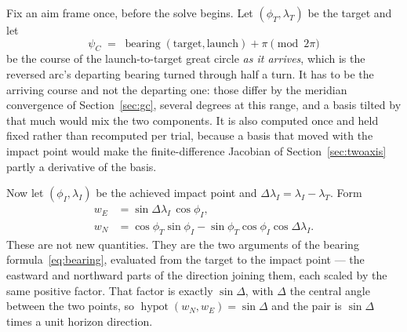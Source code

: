 \documentclass[11pt]{article}
\begin{document}
Fix an aim frame once, before the solve begins. Let $(\phi_T,\lambda_T)$ be the
target and let
\begin{equation}
  \psi_C \;=\; \operatorname{bearing}(\text{target},\text{launch}) + \pi
  \pmod{2\pi}
  \label{eq:psic}
\end{equation}
be the course of the launch-to-target great circle \emph{as it arrives}, which
is the reversed arc's departing bearing turned through half a turn. It has to
be the arriving course and not the departing one: those differ by the meridian
convergence of Section~\ref{sec:gc}, several degrees at this range, and a basis
tilted by that much would mix the two components. It is also computed once and
held fixed rather than recomputed per trial, because a basis that moved with
the impact point would make the finite-difference Jacobian of
Section~\ref{sec:twoaxis} partly a derivative of the basis.

Now let $(\phi_I,\lambda_I)$ be the achieved impact point and
$\Delta\lambda_I = \lambda_I - \lambda_T$. Form
\begin{align}
  w_E &= \sin\Delta\lambda_I\,\cos\phi_I ,                        \label{eq:wE}\\
  w_N &= \cos\phi_T\sin\phi_I - \sin\phi_T\cos\phi_I\cos\Delta\lambda_I .
                                                                  \label{eq:wN}
\end{align}
These are not new quantities. They are the two arguments of the bearing
formula~\eqref{eq:bearing}, evaluated from the target to the impact point ---
the eastward and northward parts of the direction joining them, each scaled by
the same positive factor. That factor is exactly $\sin\Delta$, with $\Delta$
the central angle between the two points, so
$\operatorname{hypot}(w_N,w_E) = \sin\Delta$ and the pair is $\sin\Delta$ times
a unit horizon direction.
\end{document}
